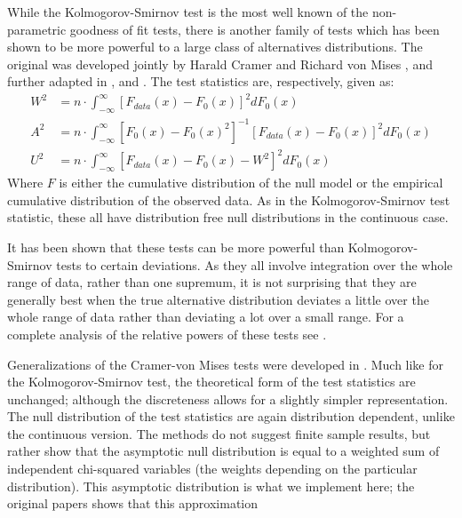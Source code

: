 \documentclass[article]{jss}
\begin{document}
While the Kolmogorov-Smirnov test is the most well known of the non-parametric goodness of fit tests, there is another family of 
tests which has been shown to be more powerful to a large class of alternatives distributions. The original was developed jointly by
Harald Cramer and Richard von Mises \citep{cramer1928, vonmises1928}, and further adapted in \cite{anderson1952}, and 
\cite{Watson1961}. The test statistics are, respectively, given as:
\begin{align*}
W^2 &= n \cdot \int_{-\infty}^{\infty} \left[ F_{data}(x)- F_{0}(x) \right]^2 dF_0(x) \\
A^2 &= n \cdot \int_{-\infty}^{\infty} \left[F_0(x) -F_0(x)^2 \right]^{-1} \left[ F_{data}(x)- F_{0}(x) \right]^2 dF_0(x) \\
U^2 &= n \cdot \int_{-\infty}^{\infty} \left[ F_{data}(x)- F_{0}(x) - W^2 \right]^2 dF_0(x)
\end{align*}
Where $F$ is either the cumulative distribution of the null model or the empirical cumulative distribution of the observed data.
As in the Kolmogorov-Smirnov test statistic, these all have distribution free null distributions in the continuous case. 

It has been shown that these tests can be more powerful than Kolmogorov-Smirnov tests to certain deviations. As they all involve
integration over the whole range of data, rather than one supremum, it is not surprising that they are generally best when the
true alternative distribution deviates a little over the whole range of data rather than deviating a lot over a small range. For
a complete analysis of the relative powers of these tests see \cite{stephens1974}.

Generalizations of the Cramer-von Mises tests were developed in \cite{choulakian1994}. Much like for the Kolmogorov-Smirnov test,
the theoretical form of the test statistics are unchanged; although the discreteness allows for a slightly simpler representation.
The null distribution of the test statistics are again distribution dependent, unlike the continuous version. The methods do not
suggest finite sample results, but rather show that the asymptotic null distribution is equal to a weighted sum of independent
chi-squared variables (the weights depending on the particular distribution). This asymptotic distribution is what we implement here;
the original papers shows that this approximation 
\end{document}
